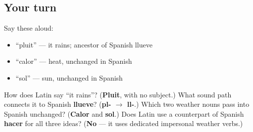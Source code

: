 \subsection*{Your turn}
Say these aloud:

\begin{itemize}
\raggedright
  \item \textquotedblleft{}pluit\textquotedblright{} — it rains; ancestor of Spanish llueve
  \item \textquotedblleft{}calor\textquotedblright{} — heat, unchanged in Spanish
  \item \textquotedblleft{}sol\textquotedblright{} — sun, unchanged in Spanish
\end{itemize}

\begin{tcolorbox}[breakable,colback=teal!4,colframe=teal!35!black,title={Before you move on}]
How does Latin say \textquotedblleft{}it rains\textquotedblright{}? (\textbf{Pluit}, with no subject.) What sound path connects it to Spanish \textbf{llueve}? (\textbf{pl- $\to$ ll-}.) Which two weather nouns pass into Spanish unchanged? (\textbf{Calor} and \textbf{sol}.) Does Latin use a counterpart of Spanish \textbf{hacer} for all three ideas? (\textbf{No} — it uses dedicated impersonal weather verbs.)
\end{tcolorbox}
